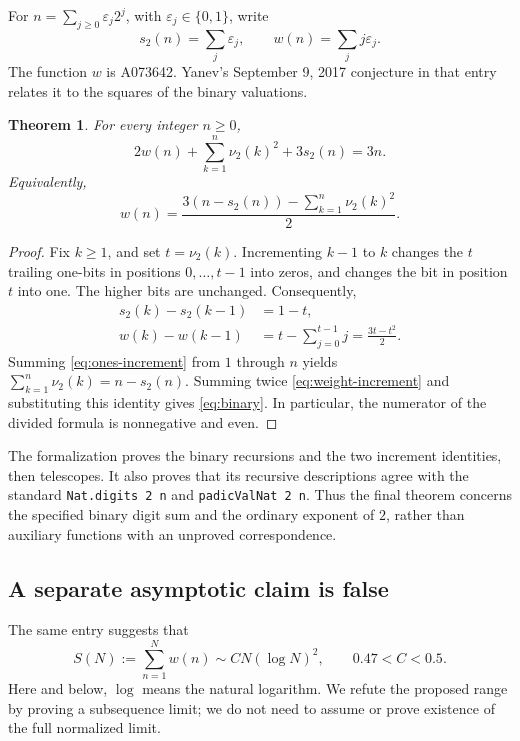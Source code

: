 \documentclass[11pt]{article}
\newtheorem{theorem}{Theorem}[section]
\begin{document}
For $n=\sum_{j\ge0}\varepsilon_j2^j$, with $\varepsilon_j\in\{0,1\}$,
write
\[
 s_2(n)=\sum_j\varepsilon_j,\qquad w(n)=\sum_jj\varepsilon_j.
\]
The function $w$ is A073642. Yanev's September 9, 2017 conjecture in that
entry~\cite{A073642} relates it to the squares of the binary valuations.

\begin{theorem}
For every integer $n\ge0$,
\begin{equation}
 \boxed{2w(n)+\sum_{k=1}^n\nu_2(k)^2+3s_2(n)=3n.}
 \label{eq:binary}
\end{equation}
Equivalently,
\[
 w(n)=\frac{3(n-s_2(n))-\sum_{k=1}^n\nu_2(k)^2}{2}.
\]
\end{theorem}
\begin{proof}
Fix $k\ge1$, and set $t=\nu_2(k)$. Incrementing $k-1$ to $k$ changes
the $t$ trailing one-bits in positions $0,\ldots,t-1$ into zeros, and
changes the bit in position $t$ into one. The higher bits are unchanged.
Consequently,
\begin{align}
 s_2(k)-s_2(k-1)&=1-t,\label{eq:ones-increment}\\
 w(k)-w(k-1)&=t-\sum_{j=0}^{t-1}j
             =\frac{3t-t^2}{2}.\label{eq:weight-increment}
\end{align}
Summing \eqref{eq:ones-increment} from $1$ through $n$ yields
$\sum_{k=1}^n\nu_2(k)=n-s_2(n)$.
Summing twice \eqref{eq:weight-increment} and substituting this identity
gives \eqref{eq:binary}. In particular, the numerator of the divided
formula is nonnegative and even.
\end{proof}

The formalization proves the binary recursions and the two increment
identities, then telescopes. It also proves that its recursive descriptions
agree with the standard \texttt{Nat.digits 2 n} and
\texttt{padicValNat 2 n}. Thus the final theorem concerns the specified
binary digit sum and the ordinary exponent of $2$, rather than auxiliary
functions with an unproved correspondence.

\subsection{A separate asymptotic claim is false}

The same entry suggests that
\[
 S(N):=\sum_{n=1}^Nw(n)\sim C N(\log N)^2,
 \qquad 0.47<C<0.5.
\]
Here and below, $\log$ means the natural logarithm. We refute the proposed
range by proving a subsequence limit; we do not need to assume or prove
existence of the full normalized limit.
\end{document}
